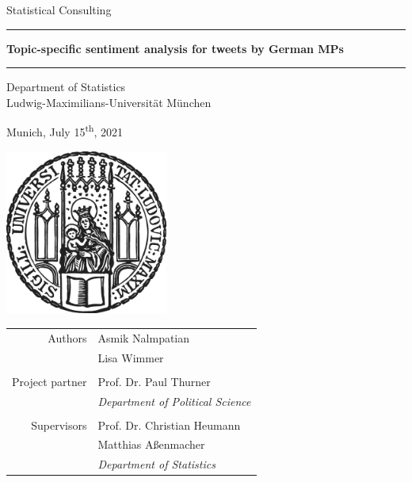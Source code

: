 \documentclass[12pt]{article}
\begin{document}


 
\begin{titlepage}
\begin{center}
    
\LARGE
Statistical Consulting
    
\vspace{0.5cm}
      
\rule{\textwidth}{1.5pt}
\Huge
\textbf{Topic-specific sentiment analysis for tweets by German MPs}
\rule{\textwidth}{1.5pt}
   
\vspace{0.5cm}
      
\large
Department of Statistics \\
Ludwig-Maximilians-Universität München 

\vfill

Munich, July 15\textsuperscript{th}, 2021
      
\vfill

\includegraphics[width = 0.4\textwidth]{figures/sigillum.png}

\vfill

\begin{tabular}{rl}
  Authors & Asmik Nalmpatian \\
  & Lisa Wimmer \\
  & \\
  Project partner & Prof. Dr. Paul Thurner \\
  & \textit{Department of Political Science} \\
  & \\
  Supervisors & Prof. Dr. Christian Heumann \\
  & Matthias Aßenmacher \\
  & \textit{Department of Statistics}
\end{tabular}

\end{center}
\end{titlepage}
\end{document}
